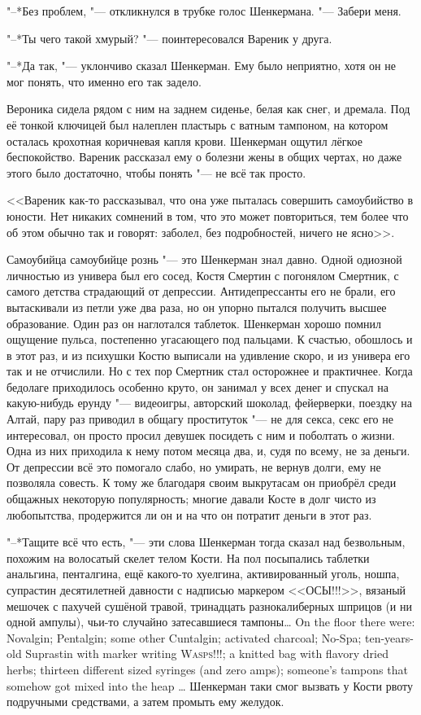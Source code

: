 "--*Без проблем, "--- откликнулся в трубке голос Шенкермана.
"--- Забери меня.

"--*Ты чего такой хмурый? "--- поинтересовался Вареник у друга.

"--*Да так, "--- уклончиво сказал Шенкерман.
Ему было неприятно, хотя он не мог понять, что именно его так задело.

Вероника сидела рядом с ним на заднем сиденье, белая как снег, и дремала.
Под её тонкой ключицей был налеплен пластырь с ватным тампоном, на котором осталась крохотная коричневая капля крови.
Шенкерман ощутил лёгкое беспокойство.
Вареник рассказал ему о болезни жены в общих чертах, но даже этого было достаточно, чтобы понять "--- не всё так просто.

<<Вареник как-то рассказывал, что она уже пыталась совершить самоубийство в юности.
Нет никаких сомнений в том, что это может повториться, тем более что об этом обычно так и говорят: заболел, без подробностей, ничего не ясно>>.

Самоубийца самоубийце рознь "--- это Шенкерман знал давно.
Одной одиозной личностью из универа был его сосед, Костя Смертин с погонялом Смертник, с самого детства страдающий от депрессии.
Антидепрессанты его не брали, его вытаскивали из петли уже два раза, но он упорно пытался получить высшее образование.
Один раз он наглотался таблеток.
Шенкерман хорошо помнил ощущение пульса, постепенно угасающего под пальцами.
К счастью, обошлось и в этот раз, и из психушки Костю выписали на удивление скоро, и из универа его так и не отчислили.
Но с тех пор Смертник стал осторожнее и практичнее.
Когда бедолаге приходилось особенно круто, он занимал у всех денег и спускал на какую-нибудь ерунду "--- видеоигры, авторский шоколад, фейерверки, поездку на Алтай, пару раз приводил в общагу проституток "--- не для секса, секс его не интересовал, он просто просил девушек посидеть с ним и поболтать о жизни.
Одна из них приходила к нему потом месяца два, и, судя по всему, не за деньги.
От депрессии всё это помогало слабо, но умирать, не вернув долги, ему не позволяла совесть.
К тому же благодаря своим выкрутасам он приобрёл среди общажных некоторую популярность;
многие давали Косте в долг чисто из любопытства, продержится ли он и на что он потратит деньги в этот раз.

"--*Тащите всё что есть, "--- эти слова Шенкерман тогда сказал над безвольным, похожим на волосатый скелет телом Кости.
{На пол посыпались таблетки анальгина, пенталгина, ещё какого-то хуелгина, активированный уголь, ношпа, супрастин десятилетней давности с надписью маркером <<ОСЫ!!!>>, вязаный мешочек с пахучей сушёной травой, тринадцать разнокалиберных шприцов (и ни одной ампулы), чьи-то случайно затесавшиеся тампоны\ldots{}}
{On the floor there were: Novalgin; Pentalgin; some other Cuntalgin; activated charcoal; No-Spa; ten-years-old Suprastin with marker writing \textsc{Wasps!!!}; a knitted bag with flavory dried herbs; thirteen different sized syringes (and zero amps); someone's tampons that somehow got mixed into the heap \ldots{}}
Шенкерман таки смог вызвать у Кости рвоту подручными средствами, а затем промыть ему желудок.

